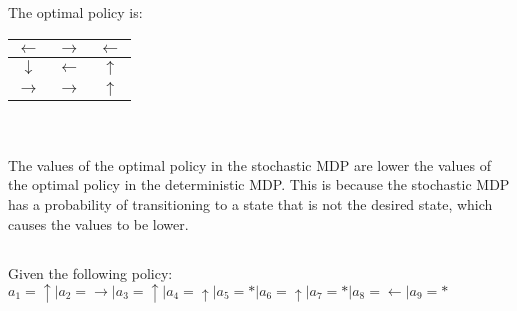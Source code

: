 \documentclass{article}
\begin{document}
    The optimal policy is: \\
    \begin{tabular}{|c|c|c|}
        \hline
            $\leftarrow $ & $\rightarrow $ & $\leftarrow $ \\
        \hline
            $\downarrow $ & $\leftarrow $ & $\uparrow $ \\
        \hline
            $\rightarrow $ & $\rightarrow $ & $\uparrow $ \\
        \hline
    \end{tabular}\\ \\
    The values of the optimal policy in the stochastic MDP are lower the values of the optimal policy in the deterministic MDP. This is because the stochastic MDP has a probability of transitioning to a state that is not the desired state, which causes the values to be lower.

    \subsection{}
    Given the following policy: $ a_1 = \uparrow | a_2 = \rightarrow | a_3 = \uparrow |  a_4 = \uparrow | a_5 = * | a_6 = \uparrow | a_7 = * | a_8 = \leftarrow | a_9 = *  $\\
\end{document}
